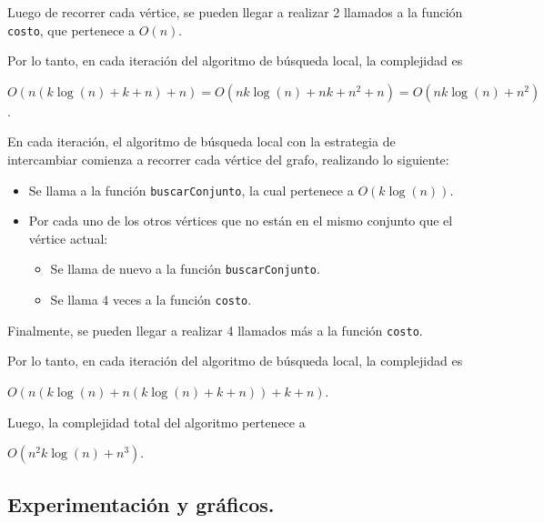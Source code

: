 Luego de recorrer cada vértice, se pueden llegar a realizar 2 llamados a
la función \texttt{costo}, que pertenece a $O(n)$.

Por lo tanto, en cada iteración del algoritmo de búsqueda local, la complejidad
es
\begin{center}
  $O(n (k\log(n) + k + n) + n) = O(nk\log(n) + nk + n^2 + n) = O(nk\log(n) +
n^2)$.
\end{center}

\vspace*{0.3cm}

En cada iteración, el algoritmo de búsqueda local con la estrategia de
intercambiar comienza a recorrer cada vértice del grafo, realizando lo siguiente:

\begin{itemize}
  \item Se llama a la función \texttt{buscarConjunto}, la cual pertenece a
  $O(k\log(n))$.

  \item Por cada uno de los otros vértices que no están en el mismo conjunto
  que el vértice actual:

  \begin{itemize}
    \item Se llama de nuevo a la función \texttt{buscarConjunto}.

    \item Se llama 4 veces a la función \texttt{costo}.
  \end{itemize}
\end{itemize}

Finalmente, se pueden llegar a realizar 4 llamados más a la función
\texttt{costo}.

Por lo tanto, en cada iteración del algoritmo de búsqueda local, la complejidad
es
\begin{center}
  $O(n (k\log(n) + n (k\log(n) + k + n)) + k + n)$.
\end{center}

\vspace{0.3cm}

Luego, la complejidad total del algoritmo pertenece a
\begin{center}
  $O(n^2k\log(n) + n^3)$.
\end{center}


\newpage \subsection{Experimentación y gráficos.}

